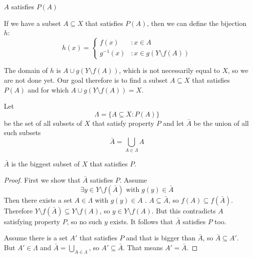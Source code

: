 \begin{marginfigure}[1.0in]
\caption{$A$ satisfies $P(A)$}
\label{fig:intersectEmpty}
\end{marginfigure}

If we have a subset $A \subseteq X$ that satisfies $P(A)$, then we can define the bijection $h$:
$$
h(x) = \begin{cases}
         f(x) & : x \in A\\
         g^{-1}(x) & : x \in g(Y \setminus f(A))
      \end{cases} 
$$

The domain of $h$ is $A \cup g(Y \setminus f(A))$, which is not necessarily equal to $X$, so we are not done yet. Our goal therefore is to find a subset $A \subseteq X$ that satisfies $P(A)$ and for which $A \cup g(Y \setminus f(A)) = X$.

Let 
$$
\varLambda = \{A \subseteq X: P(A)\}	
$$	
be the set of all subsets of $X$ that satisfy property $P$ and let $\bar{A}$ be the union of all such subsets
$$
\bar{A} = \bigcup_{A \in \varLambda} A
$$

\begin{lem}\label{biggestSubset}
$\bar{A}$ is the biggest subset of $X$ that satisfies $P$.
\end{lem}

\begin{proof}
First we show that $\bar{A}$ satisfies $P$. Assume
$$
\exists y \in Y \setminus f(\bar{A}) \text{ with } g(y) \in \bar{A}
$$
Then there exists a set $A \in \varLambda$ with $g(y) \in A$ .
$A \subseteq \bar{A}$, so $f(A) \subseteq f(\bar{A})$. Therefore $Y \setminus f(\bar{A}) \subseteq Y \setminus f(A)$, so $y \in Y \setminus f(A)$. But this contradicts $A$ satisfying property $P$, so no such $y$ exists. It follows that $\bar{A}$ satisfies $P$ too.

Assume there is a set $A'$ that satisfies $P$ and that is bigger than $\bar{A}$, so $\bar{A} \subseteq A'$. But $A' \in \varLambda$ and $\bar{A} = \bigcup_{A \in \varLambda}$, so $A' \subseteq \bar{A}$. That means $A'=\bar{A}$.
\end{proof}

